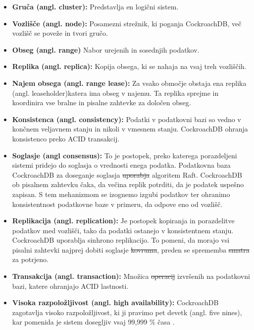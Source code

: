 \documentclass[a4paper, 12pt]{book}
\providecommand{\DIFaddtex}[1]{{\protect\color{blue}\uwave{#1}}} %
\providecommand{\DIFdeltex}[1]{{\protect\color{red}\sout{#1}}}                      %
\providecommand{\DIFaddbegin}{} %
\providecommand{\DIFaddend}{} %
\providecommand{\DIFdelbegin}{} %
\providecommand{\DIFdelend}{} %
\providecommand{\DIFadd}[1]{\texorpdfstring{\DIFaddtex{#1}}{#1}} %
\providecommand{\DIFdel}[1]{\texorpdfstring{\DIFdeltex{#1}}{}} %
\newcommand{\DIFscaledelfig}{0.5}
\newlength{\DIFdelgraphicswidth} %
\newlength{\DIFdelgraphicsheight} %
\newcommand{\DIFaddincludegraphics}[2][]{{\color{blue}\fbox{\DIFOincludegraphics[#1]{#2}}}} %
\newcommand{\DIFdelincludegraphics}[2][]{%
\sbox{\DIFdelgraphicsbox}{\DIFOincludegraphics[#1]{#2}}%
\settoboxwidth{\DIFdelgraphicswidth}{\DIFdelgraphicsbox} %
\settoboxtotalheight{\DIFdelgraphicsheight}{\DIFdelgraphicsbox} %
\scalebox{\DIFscaledelfig}{%
\parbox[b]{\DIFdelgraphicswidth}{\usebox{\DIFdelgraphicsbox}\\[-\baselineskip] \rule{\DIFdelgraphicswidth}{0em}}\llap{\resizebox{\DIFdelgraphicswidth}{\DIFdelgraphicsheight}{%
\setlength{\unitlength}{\DIFdelgraphicswidth}%
\begin{picture}(1,1)%
\thicklines\linethickness{2pt} %
{\color[rgb]{1,0,0}\put(0,0){\framebox(1,1){}}}%
{\color[rgb]{1,0,0}\put(0,0){\line( 1,1){1}}}%
{\color[rgb]{1,0,0}\put(0,1){\line(1,-1){1}}}%
\end{picture}%
}\hspace*{3pt}}} %
} %
\DeclareRobustCommand{\DIFaddbegin}{\DIFOaddbegin \let\includegraphics\DIFaddincludegraphics} %
\DeclareRobustCommand{\DIFaddend}{\DIFOaddend \let\includegraphics\DIFOincludegraphics} %
\DeclareRobustCommand{\DIFdelbegin}{\DIFOdelbegin \let\includegraphics\DIFdelincludegraphics} %
\DeclareRobustCommand{\DIFdelend}{\DIFOaddend \let\includegraphics\DIFOincludegraphics} %
\begin{document}
\begin{itemize}
    \item \textbf{Gruča (angl. cluster):} Predstavlja en logični sistem. 
    \item \textbf{Vozlišče (angl. node):} Posamezni strežnik, ki poganja Cock\-roach\-DB, več vozlišč se poveže in tvori gručo.
    \item \textbf{Obseg (angl. range)} Nabor urejenih in sosednjih podatkov.
    \item \textbf{Replika (angl. replica):} Kopija obsega, ki se nahaja na vsaj treh vozliščih.
    \item \textbf{Najem obsega (angl. range lease):} Za vsako območje obstaja ena replika (angl. leaseholder)\DIFaddbegin \DIFadd{, }\DIFaddend katera ima obseg v najemu. Ta replika sprejme in koordinira vse bralne in pisalne zahtevke za določen obseg.
    \item \textbf{Konsistenca (angl. consistency):} Podatki v podatkovni bazi so vedno v končnem veljavnem stanju in nikoli v vmesnem stanju. Cock\-roach\-DB ohranja konsistenco preko ACID transakcij.
    \item \textbf{Soglasje (angl consensus):} To je postopek, preko katerega porazdeljeni sistemi pridejo do soglasja o vrednosti enega podatka. Podatkovna baza CockroachDB za doseganje soglasja \DIFdelbegin \DIFdel{uporabja }\DIFdelend \DIFaddbegin \DIFadd{uporablja }\DIFaddend algoritem Raft. Cock\-roach\-DB ob pisalnem zahtevku čaka, da večina replik potrditi, da je podatek uspešno zapisan. S tem mehanizmom se izognemo izgubi podatkov ter ohranimo konsistentnost podatkovne baze v primeru, da odpove eno od vozlišč.
    \item \textbf{Replikacija (angl. replication):} Je postopek kopiranja in porazdelitve podatkov med vozlišči, tako da podatki ostanejo v konsistentnem stanju. Cock\-roach\-DB uporablja sinhrono replikacijo. To pomeni, da morajo vsi pisalni zahtevki najprej dobiti soglasje \DIFdelbegin \DIFdel{kovruma}\DIFdelend \DIFaddbegin \DIFadd{kvoruma}\DIFaddend , preden se sprememba \DIFdelbegin \DIFdel{smatra }\DIFdelend \DIFaddbegin \DIFadd{šteje }\DIFaddend za potrjeno.
    \item \textbf{Transakcija (angl. transaction):} Množica \DIFdelbegin \DIFdel{operacij }\DIFdelend izvršenih \DIFaddbegin \DIFadd{operacij }\DIFaddend na podatkovni bazi, katere ohranjajo ACID lastnosti.
    \item \textbf{Visoka razpoložljivost (angl. high availability):} CockroachDB zagotavlja visoko razpoložljivost, ki ji pravimo pet devetk (angl. five nines), kar pomeni\DIFaddbegin \DIFadd{, }\DIFaddend da je sistem dosegljiv vsaj 99,999 \% časa \cite{CRDB-FAQ}.
\end{itemize}
\end{document}
